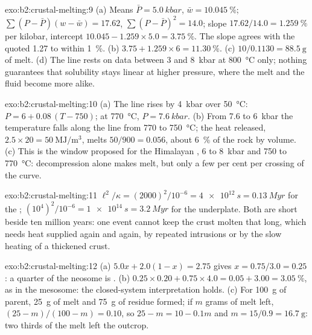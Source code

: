 \begin{solution}{exo:b2:crustal-melting:9}
(a) Means $\bar P = \qty{5.0}{kbar}$, $\bar w = \qty{10.045}{\percent}$;
$\sum(P - \bar P)(w - \bar w) = 17.62$, $\sum(P - \bar P)^2 = 14.0$; slope
$17.62/14.0 = \qty{1.259}{\percent}$ per kilobar, intercept $10.045 - 1.259\times5.0 =
\qty{3.75}{\percent}$. The slope agrees with the quoted 1.27 to within
\qty{1}{\percent}. (b) $3.75 + 1.259\times6 = \qty{11.30}{\percent}$. (c) $10/0.1130 =
\qty{88.5}{\gram}$ of melt. (d) The line rests on data between 3 and \qty{8}{kbar} at
\qty{800}{\celsius} only; nothing guarantees that solubility stays linear at higher
pressure, where the melt and the fluid become more alike.
\end{solution}

\begin{solution}{exo:b2:crustal-melting:10}
(a) The line rises by \qty{4}{kbar} over \qty{50}{\celsius}: $P = 6 + 0.08\,(T - 750)$;
at \qty{770}{\celsius}, $P = \qty{7.6}{kbar}$. (b) From 7.6 to \qty{6}{kbar} the
temperature falls along the line from 770 to \qty{750}{\celsius}; the heat released,
$2.5\times20 = \qty{50}{\mega\joule\per\cubic\metre}$, melts $50/900 = 0.056$, about
\qty{6}{\percent} of the rock by volume. (c) This is the window proposed for the
Himalayan , 6 to \qty{8}{kbar} and 750 to \qty{770}{\celsius}: decompression
alone makes melt, but only a few per cent per crossing of the curve.
\end{solution}

\begin{solution}{exo:b2:crustal-melting:11}
$\ell^2/\kappa = (2000)^2/10^{-6} = \qty{4e12}{s} = \qty{0.13}{Myr}$ for the ;
$(10^4)^2/10^{-6} = \qty{1e14}{s} = \qty{3.2}{Myr}$ for the underplate. Both are short
beside ten million years: one event cannot keep the crust molten that long, which needs
heat supplied again and again, by repeated intrusions or by the slow heating of a
thickened crust.
\end{solution}

\begin{solution}{exo:b2:crustal-melting:12}
(a) $5.0x + 2.0(1 - x) = 2.75$ gives $x = 0.75/3.0 = 0.25$: a quarter of the neosome is
. (b) $0.25\times0.20 + 0.75\times4.0 = 0.05 + 3.00 = \qty{3.05}{\percent}$, as
in the mesosome: the closed-system interpretation holds. (c) For \qty{100}{\gram} of
parent, \qty{25}{\gram} of melt and \qty{75}{\gram} of residue formed; if $m$ grams of
melt left, $(25 - m)/(100 - m) = 0.10$, so $25 - m = 10 - 0.1m$ and $m = 15/0.9 =
\qty{16.7}{\gram}$: two thirds of the melt left the outcrop.
\end{solution}


